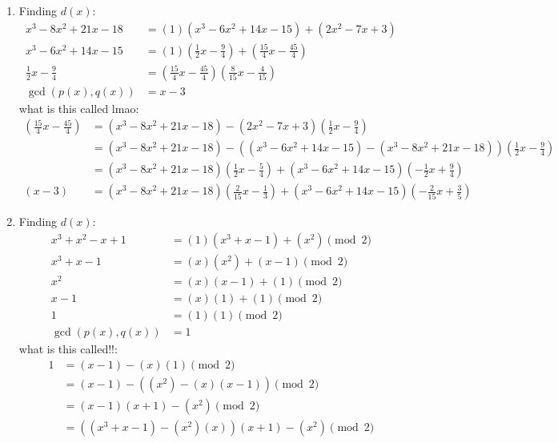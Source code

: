 \documentclass[12pt]{report}
\begin{document}
\begin{enumerate}[label=\alph*.]
    \item Finding $d(x)$:\begin{align*}
        x^3 - 8x^2 + 21x - 18 &= (1)( x^3 - 6x^2 + 14x - 15) + (2x^2 - 7x + 3) \\
        x^3 - 6x^2 + 14x - 15 &= (1)\left(\frac{1}{2}x - \frac{9}{4}\right) + \left(\frac{15}{4}x - \frac{45}{4}\right)\\
        \frac{1}{2}x - \frac{9}{4} &= \left(\frac{15}{4}x - \frac{45}{4}\right)\left(\frac{8}{15}x - \frac{4}{15}\right) \\
        \operatorname{gcd}(p(x), q(x)) &= x - 3
    \end{align*} 
    what is this called lmao:
    \begin{align*}
        \left(\frac{15}{4}x - \frac{45}{4}\right) &= (x^3 - 8x^2 + 21x - 18) - (2x^2 - 7x + 3)\left(\frac{1}{2}x - \frac{9}{4}\right) \\
        &=  (x^3 - 8x^2 + 21x - 18) - ((x^3 - 6x^2 + 14x - 15) - (x^3 - 8x^2 + 21x - 18))\left(\frac{1}{2}x - \frac{9}{4}\right) \\
        &= (x^3 - 8x^2 + 21x - 18)\left(\frac{1}{2}x - \frac{5}{4}\right) + (x^3 - 6x^2 + 14x - 15)\left(-\frac{1}{2}x + \frac{9}{4}\right) \\
        (x-3) &= (x^3 - 8x^2 + 21x - 18)\left(\frac{2}{15}x - \frac{1}{3}\right) + (x^3 - 6x^2 + 14x - 15)\left(-\frac{2}{15}x + \frac{3}{5}\right) 
    \end{align*}
    \item Finding $d(x)$:\begin{align*}
        x^3 + x^2 -x + 1 &= (1)(x^3 + x -1) + (x^2)\pmod{2}\\
        x^3 + x -1 &= (x)(x^2) + (x-1)\pmod{2} \\
        x^2 &= (x)(x-1) + (1) \pmod{2}\\
        x-1 &= (x)(1) + (1)\pmod{2} \\
        1 &= (1)(1) \pmod{2} \\
        \operatorname{gcd}(p(x), q(x)) &= 1
    \end{align*} 
    what is this called!!:
    \begin{align*}
        1 &= (x-1) - (x)(1) \pmod{2} \\
        &= (x-1) - ((x^2) - (x)(x-1))\pmod{2} \\
        &= (x-1)(x+1) - (x^2) \pmod{2} \\
        &= ((x^3+x-1)-(x^2)(x))(x+1) - (x^2) \pmod{2} \\

\end{align*}
\end{enumerate}
\end{document}
